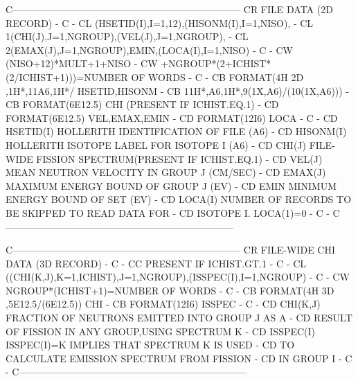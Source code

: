 \begin{ccode}
C-----------------------------------------------------------------------
CR          FILE DATA   (2D RECORD)                                    -
C                                                                      -
CL    (HSETID(I),I=1,12),(HISONM(I),I=1,NISO),                         -
CL   1(CHI(J),J=1,NGROUP),(VEL(J),J=1,NGROUP),                         -
CL   2(EMAX(J),J=1,NGROUP),EMIN,(LOCA(I),I=1,NISO)                     -
C                                                                      -
CW    (NISO+12)*MULT+1+NISO                                            -
CW    +NGROUP*(2+ICHIST*(2/ICHIST+1)))=NUMBER OF WORDS                 -
C                                                                      -
CB    FORMAT(4H 2D ,1H*,11A6,1H*/     HSETID,HISONM                    -
CB   11H*,A6,1H*,9(1X,A6)/(10(1X,A6)))                                 -
CB    FORMAT(6E12.5)                  CHI (PRESENT IF ICHIST.EQ.1)     -
CD    FORMAT(6E12.5)                  VEL,EMAX,EMIN                    -
CD    FORMAT(12I6)                    LOCA                             -
C                                                                      -
CD    HSETID(I)     HOLLERITH IDENTIFICATION OF FILE (A6)              -
CD    HISONM(I)     HOLLERITH ISOTOPE LABEL FOR ISOTOPE I (A6)         -
CD    CHI(J)        FILE-WIDE FISSION SPECTRUM(PRESENT IF ICHIST.EQ.1) -
CD    VEL(J)        MEAN NEUTRON VELOCITY IN GROUP J (CM/SEC)          -
CD    EMAX(J)       MAXIMUM ENERGY BOUND OF GROUP J (EV)               -
CD    EMIN          MINIMUM ENERGY BOUND OF SET (EV)                   -
CD    LOCA(I)       NUMBER OF RECORDS TO BE SKIPPED TO READ DATA FOR   -
CD                     ISOTOPE I.  LOCA(1)=0                           -
C                                                                      -
C-----------------------------------------------------------------------

C-----------------------------------------------------------------------
CR          FILE-WIDE CHI DATA   (3D RECORD)                           -
C                                                                      -
CC        PRESENT IF ICHIST.GT.1                                       -
C                                                                      -
CL    ((CHI(K,J),K=1,ICHIST),J=1,NGROUP),(ISSPEC(I),I=1,NGROUP)        -
C                                                                      -
CW    NGROUP*(ICHIST+1)=NUMBER OF WORDS                                -
C                                                                      -
CB    FORMAT(4H 3D ,5E12.5/(6E12.5))   CHI                             -
CB    FORMAT(12I6)                     ISSPEC                          -
C                                                                      -
CD    CHI(K,J)      FRACTION OF NEUTRONS EMITTED INTO GROUP J AS A     -
CD                     RESULT OF FISSION IN ANY GROUP,USING SPECTRUM K -
CD    ISSPEC(I)     ISSPEC(I)=K IMPLIES THAT SPECTRUM K IS USED        -
CD                     TO CALCULATE EMISSION SPECTRUM FROM FISSION     -
CD                     IN GROUP I                                      -
C                                                                      -
C-----------------------------------------------------------------------


\end{ccode}

